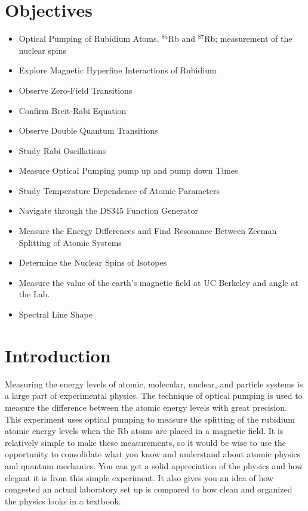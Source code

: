 \documentclass{../lab}
\begin{document}
\section{Objectives}
\begin{itemize}
    \item Optical Pumping of Rubidium Atoms, $^{85}$Rb and $^{87}$Rb; measurement of the nuclear spins
    \item Explore Magnetic Hyperfine Interactions of Rubidium
    \item Observe Zero-Field Transitions
    \item Confirm Breit-Rabi Equation
    \item Observe Double Quantum Transitions
    \item Study Rabi Oscillations
    \item Measure Optical Pumping pump up and pump down Times
    \item Study Temperature Dependence of Atomic Parameters
    \item Navigate through the DS345 Function Generator
    \item Measure the Energy Differences and Find Resonance Between Zeeman Splitting of Atomic Systems
    \item Determine the Nuclear Spins of Isotopes
    \item Measure the value of the earth's magnetic field at UC Berkeley and angle at the Lab.
    \item Spectral Line Shape
\end{itemize}

\section{Introduction}

Measuring the energy levels of atomic, molecular, nuclear, and particle systems is a large part of experimental physics. The technique of optical pumping is used to measure the difference between the atomic energy levels with great precision. This experiment uses optical pumping to measure the splitting of the rubidium atomic energy levels when the Rb atoms are placed in a magnetic field. It is relatively simple to make these measurements, so it would be wise to use the opportunity to consolidate what you know and understand about atomic physics and quantum mechanics. You can get a solid appreciation of the physics and how elegant it is from this simple experiment. It also gives you an idea of how congested an actual laboratory set up is compared to how clean and organized the physics looks in a textbook.
\end{document}
